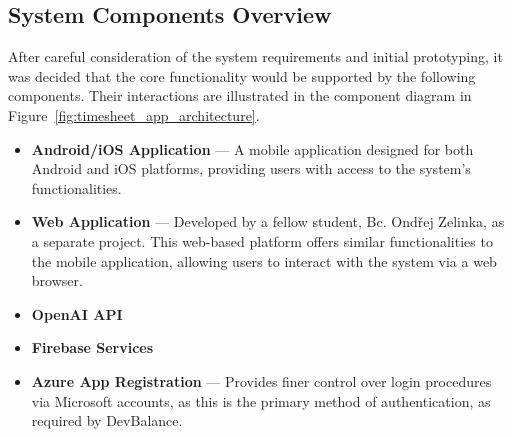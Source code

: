 \documentclass[
  digital,     %
  oneside,     %
  nosansbold,  %
  nocolorbold, %
  lof,         %
  lot,         %
]{fithesis4}
\begin{document}
\subsection{System Components Overview}

After careful consideration of the system requirements and initial prototyping, it was decided that the core functionality would be supported by the following components. Their interactions are illustrated in the component diagram in Figure~\ref{fig:timesheet_app_architecture}.

\begin{itemize}
    \item \textbf{Android/\gls{iOS} Application} --- A mobile application designed for both Android and \gls{iOS} platforms, providing users with access to the system's functionalities.
    \item \textbf{Web Application} --- Developed by a fellow student, Bc. Ondřej Zelinka, as a separate project. This web-based platform offers similar functionalities to the mobile application, allowing users to interact with the system via a web browser.
    \item \textbf{OpenAI \gls{API}}
    \item \textbf{Firebase Services}
    \item \textbf{Azure App Registration} --- Provides finer control over login procedures via Microsoft accounts, as this is the primary method of authentication, as required by DevBalance.
\end{itemize}
\end{document}
